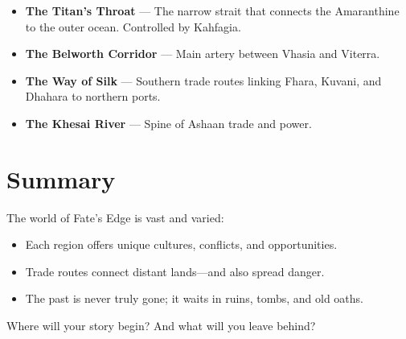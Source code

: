 \begin{itemize}
  \item \textbf{The Titan’s Throat} — The narrow strait that connects the Amaranthine to the outer ocean. Controlled by Kahfagia.
  \item \textbf{The Belworth Corridor} — Main artery between Vhasia and Viterra.
  \item \textbf{The Way of Silk} — Southern trade routes linking Fhara, Kuvani, and Dhahara to northern ports.
  \item \textbf{The Khesai River} — Spine of Ashaan trade and power.
\end{itemize}

\section{Summary}

The world of Fate’s Edge is vast and varied:

\begin{itemize}
  \item Each region offers unique cultures, conflicts, and opportunities.
  \item Trade routes connect distant lands—and also spread danger.
  \item The past is never truly gone; it waits in ruins, tombs, and old oaths.
\end{itemize}

Where will your story begin? And what will you leave behind?

